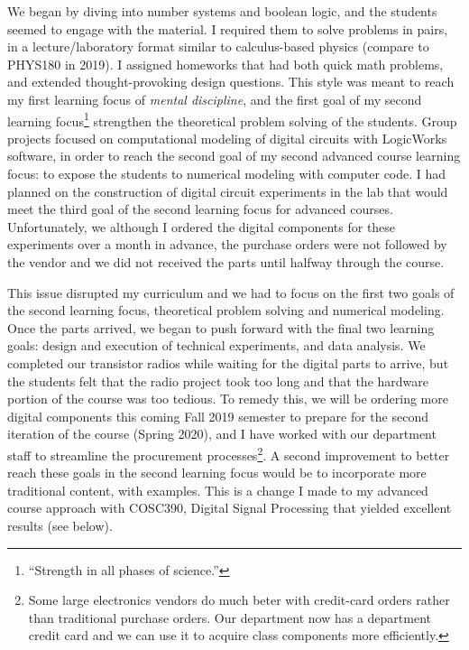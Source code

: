 \documentclass[../../../main.tex]{subfiles}
\begin{document}
We began by diving into number systems and boolean logic, and the students seemed to engage with the material.  I required them to solve problems in pairs, in a lecture/laboratory format similar to calculus-based physics (compare to PHYS180 in 2019).  I assigned homeworks that had both quick math problems, and extended thought-provoking design questions.  This style was meant to reach my first learning focus of \textit{mental discipline}, and the first goal of my second learning focus\footnote{``Strength in all phases of science.''} strengthen the theoretical problem solving of the students.  Group projects focused on computational modeling of digital circuits with LogicWorks software, in order to reach the second goal of my second advanced course learning focus: to expose the students to numerical modeling with computer code.  I had planned on the construction of digital circuit experiments in the lab that would meet the third goal of the second learning focus for advanced courses.  Unfortunately, we although I ordered the digital components for these experiments over a month in advance, the purchase orders were not followed by the vendor and we did not received the parts until halfway through the course.  \\ \hspace{0.1cm} 

This issue disrupted my curriculum and we had to focus on the first two goals of the second learning focus, theoretical problem solving and numerical modeling.  Once the parts arrived, we began to push forward with the final two learning goals: design and execution of technical experiments, and data analysis.  We completed our transistor radios while waiting for the digital parts to arrive, but the students felt that the radio project took too long and that the hardware portion of the course was too tedious.  To remedy this, we will be ordering more digital components this coming Fall 2019 semester to prepare for the second iteration of the course (Spring 2020), and I have worked with our department staff to streamline the procurement processes\footnote{Some large electronics vendors do much beter with credit-card orders rather than traditional purchase orders.  Our department now has a department credit card and we can use it to acquire class components more efficiently.}.  A second improvement to better reach these goals in the second learning focus would be to incorporate more traditional content, with examples.  This is a change I made to my advanced course approach with COSC390, Digital Signal Processing that yielded excellent results (see below).\\ \hspace{0.1cm}
\end{document}
